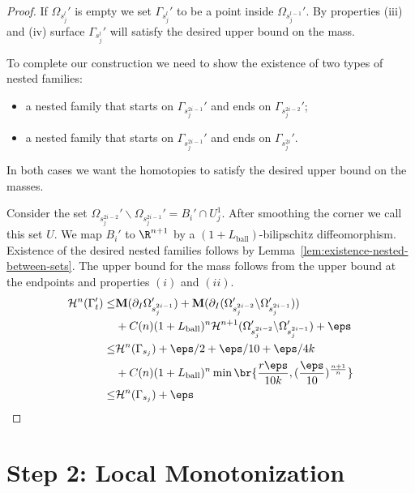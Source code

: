 \begin{lemma}
\begin{proof}
        If $\Omega_{s_j^l}'$ is empty we set $\Gamma_{s_j^l}'$ to be a point inside $\Omega_{s_j^{l - 1}}'$. By properties (iii) and (iv) surface $\Gamma_{s_j^l}'$ will satisfy the desired upper bound on the mass.

        To complete our construction we need to show the existence of two types of nested families:
        \begin{itemize}
            \item a nested family that starts on $\Gamma_{s_j^{2i - 1}}'$ and ends on $\Gamma_{s_j^{2i - 2}}'$;
            \item a nested family that starts on $\Gamma_{s_j^{2i - 1}}'$ and ends on $\Gamma_{s_j^{2i}}'$.
        \end{itemize}
        In both cases we want the homotopies to satisfy the desired upper bound on the masses.

        Consider the set $\Omega_{s_j^{2i - 2}}'\backslash\Omega_{s_j^{2i - 1}}' = B_i'\cap U_j^1$. After smoothing the corner we call this set $U$. We map $B_i'$ to $\R^{n + 1}$ by a $(1 + L_{\mathrm{ball}})$-bilipschitz diffeomorphism. Existence of the desired nested families follows by Lemma~\ref{lem:existence-nested-between-sets}. The upper bound for the mass follows from the upper bound at the endpoints and properties $(i)$ and $(ii)$.
        \begin{equation*}
            \begin{split}
                \mathcal{H}^n(\Gamma_t') \leq& \mathbf{M}(\partial_I\Omega_{s_j^{2i - 1}}') + \mathbf{M}(\partial_I(\Omega_{s_j^{2i - 2}}'\backslash\Omega_{s_j^{2i - 1}}'))\\
                &+ C(n)(1 + L_{\mathrm{ball}})^n\mathcal{H}^{n + 1}(\Omega_{s_j^{2i - 2}}'\backslash\Omega_{s_j^{2i - 1}}') + \eps\\
                \leq& \mathcal{H}^n(\Gamma_{s_j}) + \eps/2 + \eps/10 + \eps/4k\\
                &+ C(n)(1 + L_{\mathrm{ball}})^n\min\br{\frac{r\eps}{10k}, (\frac{\eps}{10})^{\frac{n + 1}{n}}}\\
                \leq& \mathcal{H}^n(\Gamma_{s_j}) + \eps
            \end{split}
        \end{equation*}
    \end{proof}
\end{lemma}
\section{Step 2: Local Monotonization}\label{sec:local-monotonization}

